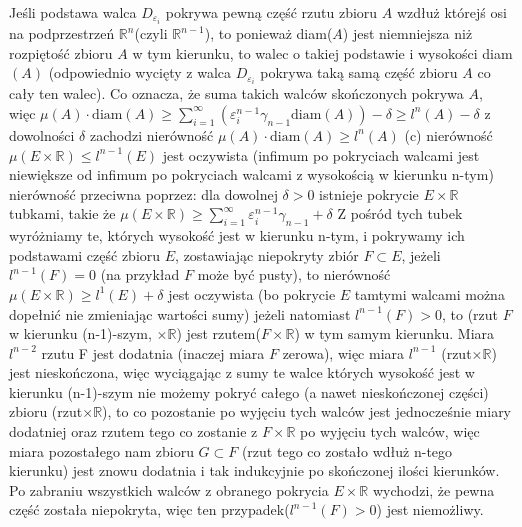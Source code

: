 \documentclass{article}
\begin{document}
Jeśli podstawa walca $D_{\varepsilon_i}$ pokrywa pewną część rzutu zbioru $A$ wzdłuż którejś osi na podprzestrzeń $\mathbb{R}^n$(czyli $\mathbb{R}^{n-1}$),
to ponieważ diam($A$) jest niemniejsza niż rozpiętość zbioru $A$ w tym kierunku, to walec o takiej podstawie i wysokości diam$(A)$
(odpowiednio wycięty z walca $D_{\varepsilon_i}$ pokrywa taką samą część zbioru $A$ co cały ten walec). Co oznacza, że suma takich walców skończonych pokrywa $A$,
więc $\mu(A)\cdot\text{diam}(A)\ge\sum\limits_{i=1}^{\infty}(\varepsilon_{i}^{n-1}\gamma_{n-1}\text{diam}(A))-\delta\ge l^n(A)-\delta$\newline
z dowolności $\delta$ zachodzi nierówność $\mu(A)\cdot\text{diam}(A)\ge l^n(A)$\newline\newline
(c)\newline
nierówność $\mu(E\times\mathbb{R})\le l^{n-1}(E)$ jest oczywista (infimum po pokryciach walcami jest niewiększe od infimum po pokryciach walcami z wysokością w kierunku n-tym)\newline
nierówność przeciwna poprzez:
dla dowolnej $\delta>0$ istnieje pokrycie $E\times\mathbb{R}$ tubkami, takie że\newline
$\mu(E\times\mathbb{R})\ge\sum\limits_{i=1}^{\infty}\varepsilon_i^{n-1}\gamma_{n-1}+\delta$\newline
Z pośród tych tubek wyróżniamy te, których wysokość jest w kierunku n-tym, i pokrywamy ich podstawami część zbioru $E$, zostawiając niepokryty zbiór $F\subset E$,
jeżeli $l^{n-1}(F)=0$ (na przykład $F$ może być pusty), to nierówność $\mu(E\times\mathbb{R})\ge l^1(E)+\delta$ jest oczywista (bo pokrycie $E$ tamtymi walcami można dopełnić nie zmieniając wartości sumy)\newline
jeżeli natomiast $l^{n-1}(F)>0$, to (rzut $F$ w kierunku (n-1)-szym, $\times\mathbb{R}$) jest rzutem($F\times\mathbb{R}$) w tym samym kierunku.\newline
Miara $l^{n-2}$ rzutu F jest dodatnia (inaczej miara $F$ zerowa), więc miara  $l^{n-1}$ (rzut$\times\mathbb{R}$) jest nieskończona, więc wyciągając z sumy
te walce których wysokość jest w kierunku (n-1)-szym nie możemy pokryć całego (a nawet nieskończonej części) zbioru (rzut$\times\mathbb{R}$),
to co pozostanie po wyjęciu tych walców jest jednocześnie miary dodatniej oraz rzutem tego co zostanie z $F\times\mathbb{R}$ po wyjęciu tych walców, więc miara
pozostałego nam zbioru $G\subset F$ (rzut tego co zostało wdłuż n-tego kierunku) jest znowu dodatnia i tak indukcyjnie po skończonej ilości kierunków.\newline
Po zabraniu wszystkich walców z obranego pokrycia $E\times\mathbb{R}$ wychodzi, że pewna część została niepokryta, więc ten przypadek($l^{n-1}(F)>0$) jest niemożliwy.\newpage
\end{document}
